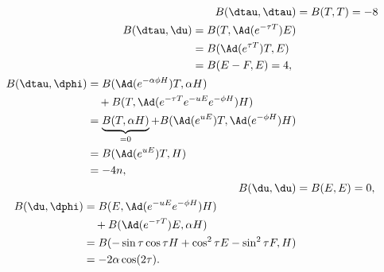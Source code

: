 \begin{align}
	B(\dtau,\dtau) & =B(T,T)=-8                                          \\
	\begin{split}
		B(\dtau,\du)  &=B(T,\Ad(e^{-\tau T})E)\\
		&=B(\Ad(e^{\tau T})T,E)\\
		&=B(E-F,E)=4,
	\end{split}                                \\
	\begin{split}
		B(\dtau,\dphi)&=B(\Ad(e^{-\alpha\phi H})T,\alpha H)\\
		&\quad +B(T, \Ad(e^{-\tau T}e^{-uE}e^{-\phi H})H  )\\
		&=\underbrace{B(T,\alpha H)}_{=0}+B( \Ad(e^{uE})T,\Ad(e^{-\phi H})H )\\
		&=B(\Ad(e^{uE})T,H)\\
		&=-4n,
	\end{split} \\
	B(\du,\du)     & =B(E,E)=0,                                          \\
	\begin{split}
		B(\du,\dphi)&=B(  E,\Ad(e^{-uE}e^{-\phi H})H )\\
		&\quad+B( \Ad(e^{-\tau T})E,\alpha H )\\
		&=B(-\sin\tau\cos\tau H+\cos^2\tau E-\sin^2\tau F,H)\\
		&=-2\alpha\cos(2\tau).
	\end{split}
\end{align}

